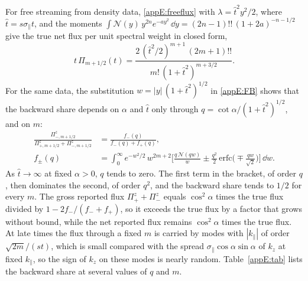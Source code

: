 For free streaming from density data, \eqref{appE:freeflux} with $\lambda=\hat t^2y^2/2$, where $\hat t=s\sigma_\parallel t$, and the moments $\int\mathcal N(y)\,y^{2n}e^{-ay^2}\,\dd y=(2n-1)!!\,(1+2a)^{-n-1/2}$ give the true net flux per unit spectral weight in closed form,
\begin{equation}\label{appE:closed}
  t\,\Pi_{m+1/2}(t)=\frac{2\,(\hat t^2/2)^{m+1}\,(2m+1)!!}{m!\,(1+\hat t^2)^{m+3/2}} .
\end{equation}
For the same data, the substitution $w=|y|\,(1+\hat t^2)^{1/2}$ in \eqref{appE:FB} shows that the backward share depends on $\alpha$ and $\hat t$ only through $q=\cot\alpha/(1+\hat t^2)^{1/2}$, and on $m$:
\begin{equation}\label{appE:share}
\begin{aligned}
  \frac{\Pi^z_{-,m+1/2}}{\Pi^z_{+,m+1/2}+\Pi^z_{-,m+1/2}}&=\frac{f_-(q)}{f_-(q)+f_+(q)},\\
  f_\pm(q)&=\int_0^\infty e^{-w^2/2}\,w^{2m+2}\Big[\frac{q\,\mathcal N(qw)}{w}\pm\frac{q^2}{2}\,\mathrm{erfc}\Big(\mp\frac{qw}{\sqrt2}\Big)\Big]\,\dd w .
\end{aligned}
\end{equation}
As $\hat t\to\infty$ at fixed $\alpha>0$, $q$ tends to zero. The first term in the bracket, of order $q$, then dominates the second, of order $q^2$, and the backward share tends to $1/2$ for every $m$. The gross reported flux $\Pi^z_++\Pi^z_-$ equals $\cos^2\alpha$ times the true flux divided by $1-2f_-/(f_-+f_+)$, so it exceeds the true flux by a factor that grows without bound, while the net reported flux remains $\cos^2\alpha$ times the true flux. At late times the flux through a fixed $m$ is carried by modes with $|k_\parallel|$ of order $\sqrt{2m}/(st)$, which is small compared with the spread $\sigma_\parallel\cos\alpha\sin\alpha$ of $k_z$ at fixed $k_\parallel$, so the sign of $k_z$ on these modes is nearly random. Table~\ref{appE:tab} lists the backward share at several values of $q$ and $m$.

